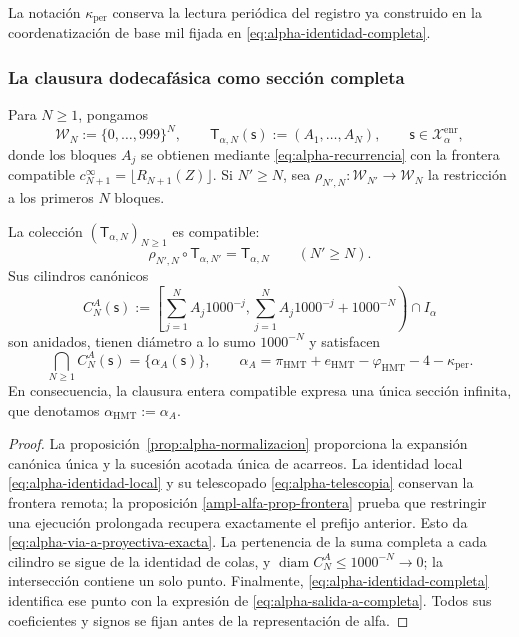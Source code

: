 La notación \(\kappa_{\mathrm{per}}\) conserva la lectura periódica del registro ya construido en la coordenatización de base mil fijada en \eqref{eq:alpha-identidad-completa}.

\subsubsection{La clausura dodecafásica como sección completa}

Para \(N\geq1\), pongamos
\[
 \mathcal W_N:=\{0,\ldots,999\}^{N},
 \qquad
 \mathsf T_{\alpha,N}(\mathsf s):=(A_1,\ldots,A_N),
 \qquad \mathsf s\in\mathcal X_{\alpha}^{\mathrm{enr}},
\]
donde los bloques \(A_j\) se obtienen mediante
\eqref{eq:alpha-recurrencia} con la frontera compatible
\(c_{N+1}^{\infty}=\lfloor R_{N+1}(Z)\rfloor\). Si \(N'\geq N\), sea
\(\rho_{N',N}:\mathcal W_{N'}\to\mathcal W_N\) la restricción a los
primeros \(N\) bloques.

\begin{theorem}
\label{thm:alpha-salida-dodecafasica-completa}
La colección \((\mathsf T_{\alpha,N})_{N\geq1}\) es compatible:
\begin{equation}
 \rho_{N',N}\circ\mathsf T_{\alpha,N'}
 =\mathsf T_{\alpha,N}
 \qquad(N'\geq N).
 \label{eq:alpha-via-a-proyectiva-exacta}
\end{equation}
Sus cilindros canónicos
\begin{equation}
 C_N^A(\mathsf s):=
 \left[
  \sum_{j=1}^{N}A_j1000^{-j},
  \sum_{j=1}^{N}A_j1000^{-j}+1000^{-N}
 \right)\cap I_\alpha
 \label{eq:alpha-cilindros-via-a-exactos}
\end{equation}
son anidados, tienen diámetro a lo sumo \(1000^{-N}\) y satisfacen
\begin{equation}
 \bigcap_{N\geq1}C_N^A(\mathsf s)
 =\{\alpha_A(\mathsf s)\},
 \qquad
 \alpha_A
 =\pi_{\mathrm{HMT}}+e_{\mathrm{HMT}}-\varphi_{\mathrm{HMT}}
  -4-\kappa_{\mathrm{per}}.
 \label{eq:alpha-salida-a-completa}
\end{equation}
En consecuencia, la clausura entera compatible expresa una única sección infinita, que
denotamos \(\alpha_{\mathrm{HMT}}:=\alpha_A\).
\end{theorem}

\begin{proof}
La proposición~\ref{prop:alpha-normalizacion} proporciona la expansión
canónica única y la sucesión acotada única de acarreos. La identidad local
\eqref{eq:alpha-identidad-local} y su telescopado
\eqref{eq:alpha-telescopia} conservan la frontera remota; la proposición
\ref{ampl-alfa-prop-frontera} prueba que restringir una ejecución prolongada
recupera exactamente el prefijo anterior. Esto da
\eqref{eq:alpha-via-a-proyectiva-exacta}. La pertenencia de la suma completa
a cada cilindro se sigue de la identidad de colas, y
\(\operatorname{diam}C_N^A\leq1000^{-N}\to0\); la intersección contiene un
solo punto. Finalmente, \eqref{eq:alpha-identidad-completa} identifica ese
punto con la expresión de \eqref{eq:alpha-salida-a-completa}. Todos sus
coeficientes y signos se fijan antes de la representación de alfa.
\end{proof}


